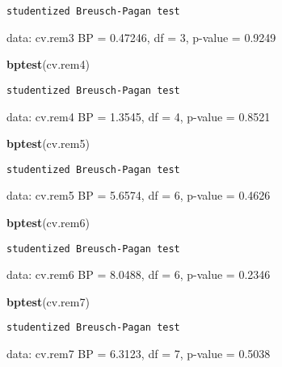 \documentclass[
]{article}
\newenvironment{Shaded}{\begin{snugshade}}{\end{snugshade}}
\newcommand{\KeywordTok}[1]{\textcolor[rgb]{0.13,0.29,0.53}{\textbf{#1}}}
\newcommand{\NormalTok}[1]{#1}
\begin{document}
\begin{verbatim}
studentized Breusch-Pagan test
\end{verbatim}

data: cv.rem3 BP = 0.47246, df = 3, p-value = 0.9249

\begin{Shaded}
\begin{Highlighting}[]
\KeywordTok{bptest}\NormalTok{(cv.rem4)}
\end{Highlighting}
\end{Shaded}

\begin{verbatim}
studentized Breusch-Pagan test
\end{verbatim}

data: cv.rem4 BP = 1.3545, df = 4, p-value = 0.8521

\begin{Shaded}
\begin{Highlighting}[]
\KeywordTok{bptest}\NormalTok{(cv.rem5)}
\end{Highlighting}
\end{Shaded}

\begin{verbatim}
studentized Breusch-Pagan test
\end{verbatim}

data: cv.rem5 BP = 5.6574, df = 6, p-value = 0.4626

\begin{Shaded}
\begin{Highlighting}[]
\KeywordTok{bptest}\NormalTok{(cv.rem6)}
\end{Highlighting}
\end{Shaded}

\begin{verbatim}
studentized Breusch-Pagan test
\end{verbatim}

data: cv.rem6 BP = 8.0488, df = 6, p-value = 0.2346

\begin{Shaded}
\begin{Highlighting}[]
\KeywordTok{bptest}\NormalTok{(cv.rem7)}
\end{Highlighting}
\end{Shaded}

\begin{verbatim}
studentized Breusch-Pagan test
\end{verbatim}

data: cv.rem7 BP = 6.3123, df = 7, p-value = 0.5038
\end{document}
